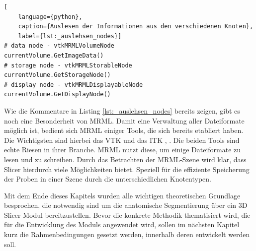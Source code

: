 \pagebreak

\begin{lstlisting}[
	language={python},
	caption={Auslesen der Informationen aus den verschiedenen Knoten},
	label={lst:_auslehsen_nodes}]
# data node - vtkMRMLVolumeNode
currentVolume.GetImageData()
# storage node - vtkMRMLStorableNode
currentVolume.GetStorageNode()
# display node - vtkMRMLDisplayableNode
currentVolume.GetDisplayNode()
\end{lstlisting}

Wie die Kommentare in Listing \ref{lst:_auslehsen_nodes} bereits zeigen, gibt es
noch eine Besonderheit von \ac{MRML}. Damit eine Verwaltung aller Dateiformate möglich
ist, bedient sich \ac{MRML} einiger Tools, die sich bereits etabliert haben. Die
Wichtigsten sind hierbei das \ac{VTK} und das \ac{ITK} \citep[vgl.][K.~1.1]{vtk2006},
\citep[vgl.][K.~1.1]{itkguide2015}. Die beiden Tools sind echte Riesen in ihrer Branche.
\ac{MRML} nutzt diese, um einige Dateiformate zu lesen und zu schreiben. Durch das
Betrachten der \ac{MRML}-Szene wird klar, dass Slicer hierdurch viele Möglichkeiten
bietet. Speziell für die effiziente Speicherung der Proben in einer Szene durch
die unterschiedlichen Knotentypen.

Mit dem Ende dieses Kapitels wurden alle wichtigen theoretischen Grundlage
besprochen, die notwendig sind um die anatomische Segmentierung über ein 3D Slicer
Modul bereitzustellen. Bevor die konkrete Methodik thematisiert wird, die für die
Entwicklung des Moduls angewendet wird, sollen im nächsten Kapitel kurz die
Rahmenbedingungen gesetzt werden, innerhalb deren entwickelt werden soll.
